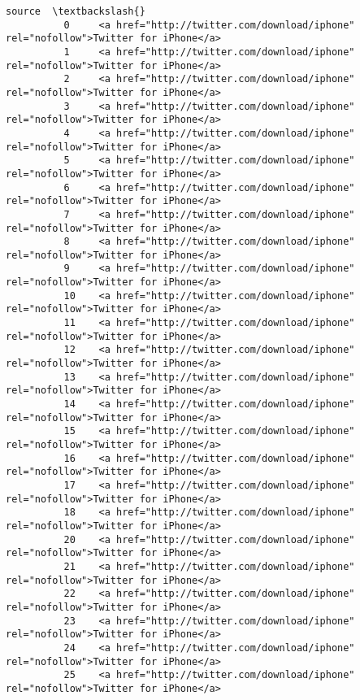 \documentclass[11pt]{article}
\begin{document}
\begin{Verbatim}[commandchars=\\\{\}]
                                                                                            source  \textbackslash{}
          0     <a href="http://twitter.com/download/iphone" rel="nofollow">Twitter for iPhone</a>   
          1     <a href="http://twitter.com/download/iphone" rel="nofollow">Twitter for iPhone</a>   
          2     <a href="http://twitter.com/download/iphone" rel="nofollow">Twitter for iPhone</a>   
          3     <a href="http://twitter.com/download/iphone" rel="nofollow">Twitter for iPhone</a>   
          4     <a href="http://twitter.com/download/iphone" rel="nofollow">Twitter for iPhone</a>   
          5     <a href="http://twitter.com/download/iphone" rel="nofollow">Twitter for iPhone</a>   
          6     <a href="http://twitter.com/download/iphone" rel="nofollow">Twitter for iPhone</a>   
          7     <a href="http://twitter.com/download/iphone" rel="nofollow">Twitter for iPhone</a>   
          8     <a href="http://twitter.com/download/iphone" rel="nofollow">Twitter for iPhone</a>   
          9     <a href="http://twitter.com/download/iphone" rel="nofollow">Twitter for iPhone</a>   
          10    <a href="http://twitter.com/download/iphone" rel="nofollow">Twitter for iPhone</a>   
          11    <a href="http://twitter.com/download/iphone" rel="nofollow">Twitter for iPhone</a>   
          12    <a href="http://twitter.com/download/iphone" rel="nofollow">Twitter for iPhone</a>   
          13    <a href="http://twitter.com/download/iphone" rel="nofollow">Twitter for iPhone</a>   
          14    <a href="http://twitter.com/download/iphone" rel="nofollow">Twitter for iPhone</a>   
          15    <a href="http://twitter.com/download/iphone" rel="nofollow">Twitter for iPhone</a>   
          16    <a href="http://twitter.com/download/iphone" rel="nofollow">Twitter for iPhone</a>   
          17    <a href="http://twitter.com/download/iphone" rel="nofollow">Twitter for iPhone</a>   
          18    <a href="http://twitter.com/download/iphone" rel="nofollow">Twitter for iPhone</a>   
          20    <a href="http://twitter.com/download/iphone" rel="nofollow">Twitter for iPhone</a>   
          21    <a href="http://twitter.com/download/iphone" rel="nofollow">Twitter for iPhone</a>   
          22    <a href="http://twitter.com/download/iphone" rel="nofollow">Twitter for iPhone</a>   
          23    <a href="http://twitter.com/download/iphone" rel="nofollow">Twitter for iPhone</a>   
          24    <a href="http://twitter.com/download/iphone" rel="nofollow">Twitter for iPhone</a>   
          25    <a href="http://twitter.com/download/iphone" rel="nofollow">Twitter for iPhone</a>   

\end{Verbatim}
\end{document}
